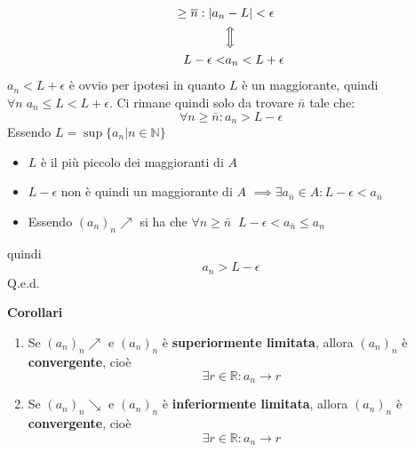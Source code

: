 {\begin{enumerate}
\begin{align*}
            \geq \overline{n} : |a_n& - L| < \epsilon\\
            &\Big\Updownarrow\\
            L - \epsilon < &a_n < L + \epsilon
        \end{align*}
        $a_n < L + \epsilon$ è ovvio per ipotesi in quanto $L$ è un maggiorante, 
        quindi $\forall n \; a_n \leq L < L + \epsilon$. Ci rimane quindi solo 
        da trovare $\bar{n}$ tale che:
        \begin{equation*}
            \forall n \geq \bar{n} : a_n > L - \epsilon
        \end{equation*}
        Essendo $L = \sup \{a_n | n \in \mathbb{N}\}$
        \begin{itemize}
            \item $L$ è il più piccolo dei maggioranti di $A$
            \item $L - \epsilon$ non è quindi un maggiorante di $A$ $\implies 
              \exists a_{\bar{n}} \in A : L -\epsilon < a_{\bar{n}}$
            \item Essendo $(a_n)_n \nearrow$ si ha che $\forall n \geq \bar{n} 
              \;\; L-\epsilon < a_{\bar{n}} \leq a_{n}$
        \end{itemize}
        quindi
        \begin{equation*}
            a_n > L - \epsilon
        \end{equation*}
        \hfill Q.e.d.
\end{enumerate}
}
\textbf{Corollari} \label{corol_successioni}
\begin{enumerate}
    \item Se $(a_n)_n \nearrow$ e $(a_n)_n$ è \textbf{superiormente limitata}, 
      allora $(a_n)_n$ è \textbf{convergente}, cioè
        \begin{equation*}
            \exists r \in \mathbb{R} : a_n \xrightarrow{\quad} r
        \end{equation*}
    \item Se $(a_n)_n \searrow$ e $(a_n)_n$ è \textbf{inferiormente limitata}, 
      allora $(a_n)_n$ è \textbf{convergente}, cioè
        \begin{equation*}
            \exists r \in \mathbb{R} : a_n \xrightarrow{\quad} r
        \end{equation*}
\end{enumerate}
